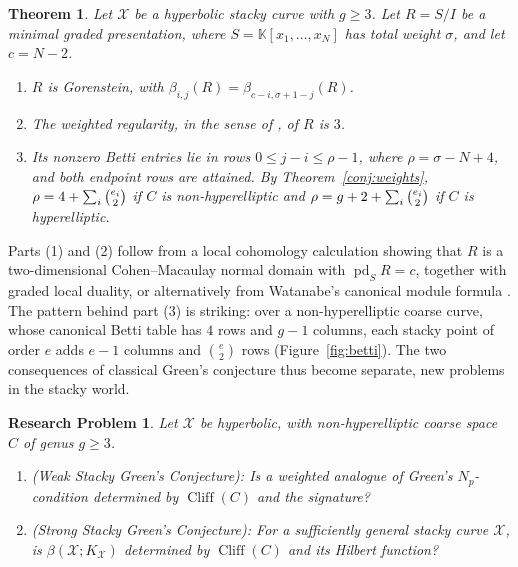 \documentclass[11pt,reqno]{amsart}
\newtheorem{theorem}[lemma]{Theorem}
\newtheorem{problem}[lemma]{Research Problem}
\theoremstyle{remark}
\newcommand{\pd}{\operatorname{pd}}
\newcommand{\cliff}{\operatorname{Cliff}}
\newcommand{\KK}{\mathbb{K}}
\newcommand{\cX}{\mathcal{X}}
\begin{document}
\begin{theorem}\label{thm:duality}
Let $\cX$ be a hyperbolic stacky curve with $g\geq3$. Let $R=S/I$ be a minimal graded presentation, where $S=\KK[x_1,\ldots,x_N]$ has total weight $\sigma$, and let $c=N-2$.
\begin{enumerate}
\item $R$ is Gorenstein, with $\beta_{i,j}(R)=\beta_{c-i,\sigma+1-j}(R)$.
\item The weighted regularity, in the sense of \cite{brownErman25}, of $R$ is $3$.
\item Its nonzero Betti entries lie in rows $0\leq j-i\leq\rho-1$, where $\rho=\sigma-N+4$, and both endpoint rows are attained. By Theorem~\ref{conj:weights}, $\rho=4+\sum_i\tbinom{e_i}{2}$ if $C$ is non-hyperelliptic and $\rho=g+2+\sum_i\tbinom{e_i}{2}$ if $C$ is hyperelliptic.
\end{enumerate}
\end{theorem}

Parts (1) and (2) follow from a local cohomology calculation showing that $R$ is a two-dimensional Cohen--Macaulay normal domain with $\pd_SR=c$, together with graded local duality, or alternatively from Watanabe's canonical module formula \cite{watanabe81}. The pattern behind part (3) is striking: over a non-hyperelliptic coarse curve, whose canonical Betti table has $4$ rows and $g-1$ columns, each stacky point of order $e$ adds $e-1$ columns and $\binom{e}{2}$ rows (Figure~\ref{fig:betti}). The two consequences of classical Green's conjecture thus become separate, new problems in the stacky world.

\begin{problem}\label{prob:ws}
Let $\cX$ be hyperbolic, with non-hyperelliptic coarse space $C$ of genus $g\geq3$.\begin{enumerate}
\item (Weak Stacky Green's Conjecture): Is a weighted analogue of Green's $N_p$-condition determined by $\cliff(C)$ and the signature?
\item (Strong Stacky Green's Conjecture): For a sufficiently general stacky curve $\cX$, is $\beta(\cX;K_{\cX})$ determined by $\cliff(C)$ and its Hilbert function?
\end{enumerate}
\end{problem}
\end{document}
